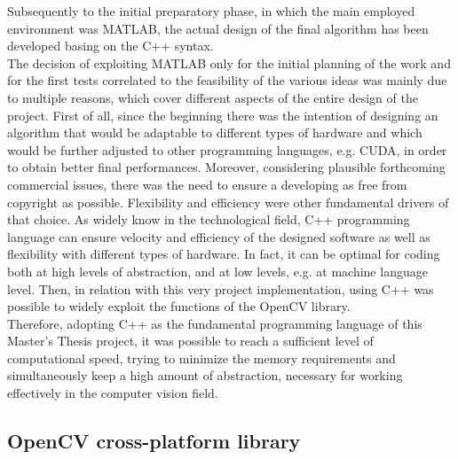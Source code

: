 Subsequently to the initial preparatory phase, in which the main employed environment was MATLAB, the actual design of the final algorithm has been developed basing on the C++ syntax.\\
The decision of exploiting MATLAB only for the initial planning of the work and for the first tests correlated to the feasibility of the various ideas was mainly due to multiple reasons, which cover different aspects of the entire design of the project.
First of all, since the beginning there was the intention of designing an algorithm that would be adaptable to different types of hardware and which would be further adjusted to other programming languages, e.g. CUDA, in order to obtain better final performances.
Moreover, considering plausible forthcoming commercial issues, there was the need to ensure a developing as free from copyright as possible. 
Flexibility and efficiency were other fundamental drivers of that choice. 
As widely know in the technological field, C++ programming language can ensure velocity and efficiency of the designed software as well as flexibility with different types of hardware.
In fact, it can be optimal for coding both at high levels of abstraction, and at low levels, e.g. at machine language level.
Then, in relation with this very project implementation, using C++ was possible to widely exploit the functions of the OpenCV library. \\
Therefore, adopting C++ as the fundamental programming language of this Master's Thesis project, it was possible to reach a sufficient level of computational speed, trying to minimize the memory requirements and simultaneously keep a high amount of abstraction, necessary for working effectively in the computer vision field. 


\subsection{OpenCV cross-platform library}
\label{subsection:opencv-env}

